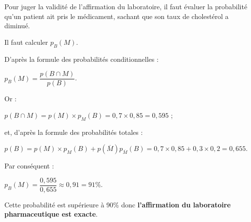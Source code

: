 \begin{corrige}
\begin{center}
\begin{extern}
          \end{extern}
     \end{center}
     Pour juger la validité de l'affirmation du laboratoire, il faut évaluer la probabilité qu'un patient ait pris le médicament, sachant que son taux de cholestérol a diminué.
     \par
     Il faut calculer $p_B(M)$.
     \par
     D'après la formule des probabilités conditionnelles :
     \par
     $p_B(M)=\dfrac{p(B \cap M)}{p(B)}$.
     \par
     Or :
     \par
     $p(B \cap M) = p(M) \times p_M(B)=0,7 \times 0,85 = 0,595$ ;
     \par
     et, d'après la formule des probabilités totales :
     \par
     $p(B)=p(M) \times p_M(B) + p(\overline{M})  p_{\overline{M}}(B) = 0,7 \times 0,85 +0,3 \times 0,2=0,655$.
     \par
     Par conséquent :
     \par
     $p_B(M)=\dfrac{0,595}{0,655} \approx 0,91 = 91\%$.
     \par
     Cette probabilité est supérieure à 90\% donc \textbf{l'affirmation du laboratoire pharmaceutique est exacte}.
\end{corrige}
